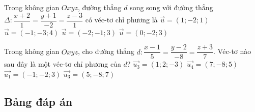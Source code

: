 \begin{ex}%
	Trong không gian $Oxyz$, đường thẳng $d$ song song với đường thẳng $\Delta \colon \dfrac{x+2}{1}=\dfrac{y+1}{-2}=\dfrac{z-3}{1}$ có véc-tơ chỉ phương là
	\choice
	{\True $\overrightarrow{u}=(1;-2;1)$}
	{$\overrightarrow{u}=(-1;-3;4)$}
	{$\overrightarrow{u}=(-2;-1;3)$}
	{$\overrightarrow{u}=(0;-2;3)$}
\end{ex}

\begin{ex}%
	Trong không gian $Oxyz$, cho đường thẳng $d \colon \dfrac{x-1}{5}=\dfrac{y-2}{-8}=\dfrac{z+3}{7}$. Véc-tơ nào sau đây là một véc-tơ chỉ phương của $d$?
	\choice
	{$\overrightarrow{u_3}=(1;2;-3)$}
	{$\overrightarrow{u_4}=(7;-8;5)$}
	{$\overrightarrow{u_1}=(-1;-2;3)$}
	{\True $\overrightarrow{u_3}=(5;-8;7)$}
\end{ex}

\subsection{Bảng đáp án}
